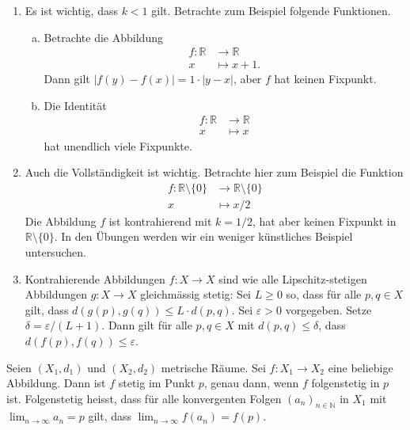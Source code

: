 \documentclass[../main.tex]{subfiles}
\begin{document}
\begin{remarks}
  \leavevmode
  \begin{enumerate}[(1)]
    \item Es ist wichtig, dass $k < 1$ gilt.
      Betrachte zum Beispiel folgende Funktionen.
      \begin{enumerate}[(a)]
        \item Betrachte die Abbildung
          \begin{align*}
            f \colon \mathbb{R} & \to \mathbb{R} \\
            x & \mapsto x + 1.
          \end{align*}
          Dann gilt $|f(y) - f(x)| = 1 \cdot |y - x|$,
          aber $f$ hat keinen Fixpunkt.
        \item Die Identität
          \begin{align*}
            f \colon \mathbb{R} & \to \mathbb{R} \\
            x & \mapsto x
          \end{align*}
          hat unendlich viele Fixpunkte.
      \end{enumerate}
    \item Auch die Vollständigkeit ist wichtig.
      Betrachte hier zum Beispiel die Funktion
      \begin{align*}
        f \colon \mathbb{R} \setminus \{0\} & \to \mathbb{R} \setminus \{0\} \\
        x & \mapsto x/2
      \end{align*}
      Die Abbildung $f$ ist kontrahierend mit $k = 1/2$,
      hat aber keinen Fixpunkt in $\mathbb{R} \setminus \{0\}$.
      In den Übungen werden wir ein weniger künstliches Beispiel
      untersuchen.
    \item 
      Kontrahierende Abbildungen $f \colon X \to X$ 
      sind wie alle Lipschitz-stetigen Abbildungen
      $g \colon X \to X$ gleichmässig stetig:
      Sei $L \geq 0$ so, dass für alle
      $p, q \in X$ 
      gilt, dass
      $d(g(p), g(q)) \leq L \cdot d(p, q)$.
      Sei $\varepsilon > 0$ vorgegeben.
      Setze $\delta = \varepsilon/(L+1)$.
      Dann gilt für alle $p, q \in X$ mit $d(p, q) \leq \delta$,
      dass $d(f(p), f(q)) \leq \varepsilon$.
  \end{enumerate}
\end{remarks}

\begin{lemma*}
  Seien $(X_1, d_1)$ und $(X_2, d_2)$ metrische Räume.
  Sei $f \colon X_1 \to X_2$ eine beliebige Abbildung.
  Dann ist $f$ stetig im Punkt $p$, genau dann, wenn $f$ 
  folgenstetig in $p$ ist.
  Folgenstetig heisst, dass für alle konvergenten Folgen
  ${(a_{n})}_{n \in \mathbb{N}}$ in $X_1$ mit
  $\lim_{n \to \infty} a_n = p$ gilt,
  dass $\lim_{n \to \infty} f(a_n) = f(p)$.
\end{lemma*}
 
\end{document}
